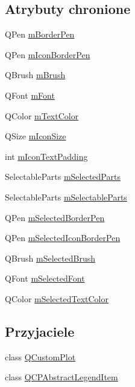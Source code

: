 \subsection*{Atrybuty chronione}
\begin{DoxyCompactItemize}
\item 
Q\+Pen \hyperlink{class_q_c_p_legend_a52ab8342a382456131d567f962d7f9d0}{m\+Border\+Pen}
\item 
Q\+Pen \hyperlink{class_q_c_p_legend_a773ae518c3149fcabff4a2906fdacbc4}{m\+Icon\+Border\+Pen}
\item 
Q\+Brush \hyperlink{class_q_c_p_legend_a9bd7cd05a9a485e06eda513a348baf80}{m\+Brush}
\item 
Q\+Font \hyperlink{class_q_c_p_legend_a56ffacb184a99eefe09a0c7181d0713d}{m\+Font}
\item 
Q\+Color \hyperlink{class_q_c_p_legend_a478b2d809a7390e9ff8f8bb70d6bd9fe}{m\+Text\+Color}
\item 
Q\+Size \hyperlink{class_q_c_p_legend_a39b972aae6c6a3fa5aa73313ab7a5765}{m\+Icon\+Size}
\item 
int \hyperlink{class_q_c_p_legend_a8abf8843864ee9afc3f54f906c062240}{m\+Icon\+Text\+Padding}
\item 
Selectable\+Parts \hyperlink{class_q_c_p_legend_a917a34dd2856baafd8d56852d94d00e2}{m\+Selected\+Parts}
\item 
Selectable\+Parts \hyperlink{class_q_c_p_legend_a179b4d5c1bea723b76e402ff48f0d7fb}{m\+Selectable\+Parts}
\item 
Q\+Pen \hyperlink{class_q_c_p_legend_a62906c996906ae23e9f724b6ac1f7334}{m\+Selected\+Border\+Pen}
\item 
Q\+Pen \hyperlink{class_q_c_p_legend_a7429ac0e64c7b90b649b4d8f4cc5fa55}{m\+Selected\+Icon\+Border\+Pen}
\item 
Q\+Brush \hyperlink{class_q_c_p_legend_ab3c7567c86d4784b1e48f76a84b3a1e2}{m\+Selected\+Brush}
\item 
Q\+Font \hyperlink{class_q_c_p_legend_a86ce8f6c20a2f51a48eaf3c24ce16805}{m\+Selected\+Font}
\item 
Q\+Color \hyperlink{class_q_c_p_legend_a6c25c8796c6e73e983aae6024965f2be}{m\+Selected\+Text\+Color}
\end{DoxyCompactItemize}
\subsection*{Przyjaciele}
\begin{DoxyCompactItemize}
\item 
class \hyperlink{class_q_c_p_legend_a1cdf9df76adcfae45261690aa0ca2198}{Q\+Custom\+Plot}
\item 
class \hyperlink{class_q_c_p_legend_a8a375e31e42c68de049fcf0fd35db5b0}{Q\+C\+P\+Abstract\+Legend\+Item}
\end{DoxyCompactItemize}

